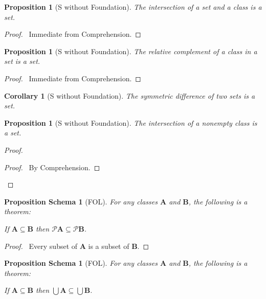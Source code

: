 \documentclass{book}
\let\qed\relax
\newtheorem{prop}[ax]{Proposition}
\newtheorem{props}[ax]{Proposition Schema}
\newtheorem{cor}{Corollary}[ax]
\theoremstyle{definition}
\begin{document}
\begin{prop}[S without Foundation]
The intersection of a set and a class is a set.
\end{prop}

\begin{proof}
\pf\ Immediate from Comprehension. \qed
\end{proof}

\begin{prop}[S without Foundation]
The relative complement of a class in a set is a set.
\end{prop}

\begin{proof}
\pf\ Immediate from Comprehension. \qed
\end{proof}

\begin{cor}[S without Foundation]
The symmetric difference of two sets is a set.
\end{cor}

\begin{prop}[S without Foundation]
The intersection of a nonempty class is a set.
\end{prop}

\begin{proof}
\pf
{}
\begin{proof}
	\pf\ By Comprehension.
\end{proof}
\qed
\end{proof}

\begin{props}[FOL]
\label{prop:powermono}
For any classes $\mathbf{A}$ and $\mathbf{B}$, the following is a theorem:

If $\mathbf{A} \subseteq \mathbf{B}$ then $\mathcal{P} \mathbf{A} \subseteq \mathcal{P} \mathbf{B}$.
\end{props}

\begin{proof}
\pf\ Every subset of $\mathbf{A}$ is a subset of $\mathbf{B}$. \qed
\end{proof}

\begin{props}[FOL]
\label{prop:unionmonotone}
For any classes $\mathbf{A}$ and $\mathbf{B}$, the following is a theorem:

If $\mathbf{A} \subseteq \mathbf{B}$ then $\bigcup \mathbf{A} \subseteq \bigcup \mathbf{B}$.
\end{props}
\end{document}
